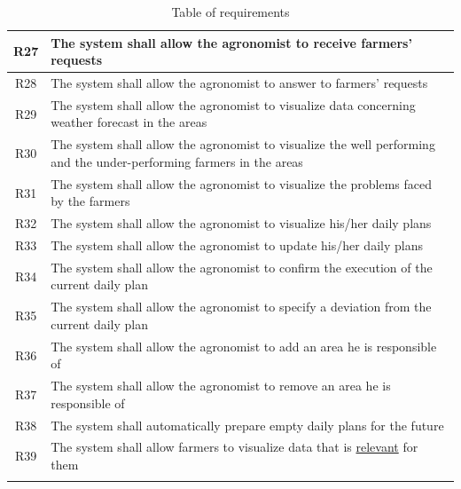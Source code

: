 \begin{center}
\begin{longtable}{|c|m{}|}
            \textsc{R27}  &    The system shall allow the agronomist to receive farmers' requests  \\
            \hline
            \textsc{R28}  &    The system shall allow the agronomist to answer to farmers' requests  \\
            \hline
            \textsc{R29}  &    The system shall allow the agronomist to visualize data concerning weather forecast in the areas  \\
            \hline
            \textsc{R30}  &    The system shall allow the agronomist to visualize the well performing and the under-performing farmers in the areas  \\
            \hline
            \textsc{R31}  &    The system shall allow the agronomist to visualize the problems faced by the farmers  \\
            \hline
            \textsc{R32}  &    The system shall allow the agronomist to visualize his/her daily plans  \\
            \hline
            \textsc{R33}  &    The system shall allow the agronomist to update his/her daily plans  \\
            \hline
            \textsc{R34}  &    The system shall allow the agronomist to confirm the execution of the current daily plan  \\
            \hline
            \textsc{R35}  &    The system shall allow the agronomist to specify a deviation from the current daily plan  \\
            \hline
            \textsc{R36}  &    The system shall allow the agronomist to add an area he is responsible of  \\
            \hline
            \textsc{R37}  &    The system shall allow the agronomist to remove an area he is responsible of  \\
            \hline
            \hline
            \hline
            \textsc{R38}  &    The system shall automatically prepare empty daily plans for the future  \\
            \hline
	    \textsc{R39}  &    The system shall allow farmers to visualize data that is \hyperref[tab:def]{relevant} for them \\
            \hline
            
        
        \rowcolor{white}\caption{\label{tab:requirements}Table of requirements}
        
    \end{longtable}
\end{center}

